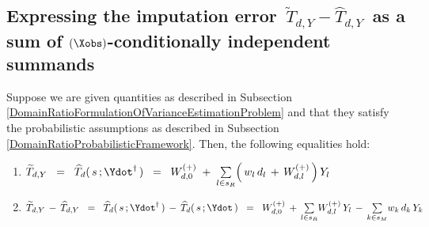
\clearpage
\subsection{Expressing the imputation error
\,$\widetilde{T}_{d,Y} - \widehat{T}_{d,Y}$\,
as a sum of $(\Xobs)$-conditionally independent summands}
\setcounter{theorem}{0}


\vskip 0.1cm
\begin{lemma}
\label{DomainRatioNumeratorImputationError}
\mbox{}
\vskip 0.1cm
\noindent
Suppose we are given quantities as described in Subsection
\ref{DomainRatioFormulationOfVarianceEstimationProblem}
and
that they satisfy the probabilistic assumptions as described in Subsection
\ref{DomainRatioProbabilisticFramework}.
\vskip 0.1cm
\noindent
Then, the following equalities hold:
\renewcommand{\theenumi}{\roman{enumi}}
\renewcommand{\labelenumi}{\mbox{}\;\;\,(\theenumi)$\quad$}
\begin{enumerate}
\item
    $
    \widetilde{T}_{d,Y}
    \;\; = \;\;
    \widehat{T}_{d}(\,s\,;\Ydot^{\dagger}\,)
    \;\; = \;\;
        W^{(+)}_{d,0}
        \;+\;
        \underset{l \in s_{R}}{\sum}\!\left(\,w_{l}\,d_{l} \,+\, W^{(+)}_{d,l}\,\right)Y_{l}
    $
\item
    $
    \widetilde{T}_{d,Y} \,-\, \widehat{T}_{d,Y}
    \;\; = \;\;
    \widehat{T}_{d}(\,s\,;\Ydot^{\dagger}\,)
    \,-\,
    \widehat{T}_{d}(\,s\,;\Ydot\,)
    \;\; = \;\;
        W^{(+)}_{d,0}
        \,+\,
        \underset{l \in s_{R}}{\sum}W^{(+)}_{d,l}\,Y_{l}
        \,-\,
        \underset{k \in s_{M}}{\sum}w_{k}\,d_{k}\,Y_{k}
    $
\end{enumerate}

\end{lemma}
